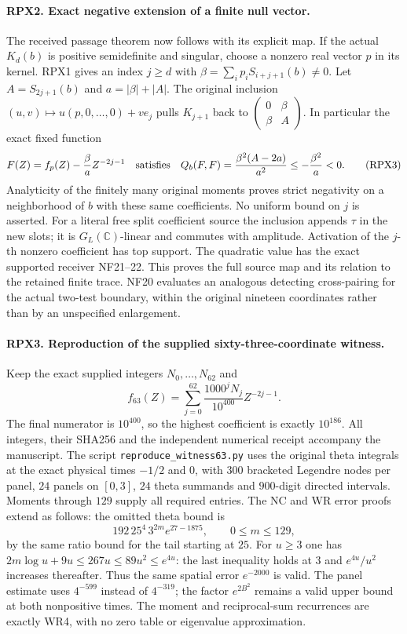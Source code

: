 \documentclass[11pt,a4paper]{article}
\theoremstyle{definition}\newtheorem{definition}[theorem]{Definition}
\begin{document}
\paragraph{RPX2. Exact negative extension of a finite null vector.}
The received passage theorem now follows with its explicit map.
If the actual $K_d(b)$ is positive semidefinite and singular,
choose a nonzero real vector $p$ in its kernel. RPX1 gives an
index $j\ge d$ with $\beta=\sum_i p_iS_{i+j+1}(b)\ne0$.
Let $A=S_{2j+1}(b)$ and $a=|\beta|+|A|$. The original inclusion
$(u,v)\mapsto u(p,0,\ldots,0)+ve_j$ pulls $K_{j+1}$ back to
$\left(\begin{smallmatrix}0&\beta\\\beta&A\end{smallmatrix}\right)$.
In particular the exact fixed function
\[
 F(Z)=f_p(Z)-\frac{\beta}{a}Z^{-2j-1}
 \quad\hbox{satisfies}\quad
 Q_b(F,F)=\frac{\beta^2(A-2a)}{a^2}
 \le-\frac{\beta^2}{a}<0.
 \tag{RPX3}
\]
Analyticity of the finitely many original moments proves strict
negativity on a neighborhood of $b$ with these same coefficients.
No uniform bound on $j$ is asserted. For a literal free split
coefficient source the inclusion appends $\tau$ in the new slots;
it is $G_L(\mathbb C)$-linear and commutes with amplitude.
Activation of the $j$-th nonzero coefficient has top support.
The quadratic value has the exact supported receiver NF21--22.
This proves the full source map and its relation to the retained
finite trace. NF20 evaluates an analogous detecting cross-pairing
for the actual two-test boundary, within the original nineteen
coordinates rather than by an unspecified enlargement.

\paragraph{RPX3. Reproduction of the supplied sixty-three-coordinate witness.}
Keep the exact supplied integers $N_0,\ldots,N_{62}$ and
\[
 f_{63}(Z)=\sum_{j=0}^{62}\frac{1000^jN_j}{10^{400}}Z^{-2j-1}.
 \tag{RPX4}
\]
The final numerator is $10^{400}$, so the highest coefficient
is exactly $10^{186}$. All integers, their SHA256 and the
independent numerical receipt accompany the manuscript. The
script \texttt{reproduce\_witness63.py} uses the original theta
integrals at the exact physical times $-1/2$ and $0$, with
$300$ bracketed Legendre nodes per panel, $24$ panels on $[0,3]$,
$24$ theta summands and $900$-digit directed intervals. Moments
through $129$ supply all required entries. The NC and WR error
proofs extend as follows: the omitted theta bound is
\[
 192\,25^4\,3^{2m}e^{27-1875},\qquad 0\le m\le129,
 \tag{RPX5}
\]
by the same ratio bound for the tail starting at $25$.
For $u\ge3$ one has
$2m\log u+9u\le267u\le89u^2\le e^{4u}$: the last inequality
holds at $3$ and $e^{4u}/u^2$ increases thereafter. Thus the
same spatial error $e^{-2000}$ is valid. The panel estimate
uses $4^{-599}$ instead of $4^{-319}$; the factor $e^{2B^2}$
remains a valid upper bound at both nonpositive times.
The moment and reciprocal-sum recurrences are exactly WR4,
with no zero table or eigenvalue approximation.
\end{document}
